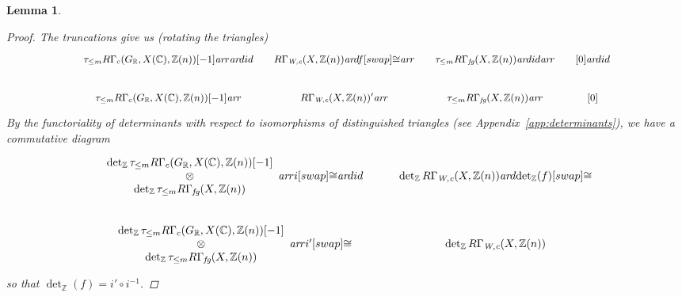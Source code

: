 \documentclass[10pt,a4paper,oneside]{article}
\newcommand{\CC}{\mathbb{C}}
\newcommand{\RR}{\mathbb{R}}
\newcommand{\ZZ}{\mathbb{Z}}
\renewcommand{\det}{\operatorname{det}}
\newcommand{\ar}{\text{\it ar}}
\newcommand{\fg}{\text{\it fg}}
\newcommand{\Wc}{\text{\it W,c}}
\theoremstyle{myplain}
\newtheorem{lemma}[theorem]{Lemma}
\theoremstyle{mydefinition}
\numberwithin{equation}{section}
\begin{document}
\begin{lemma}
\begin{proof}
    The truncations give us (rotating the triangles)
    \[ \begin{tikzcd}[column sep=1em,font=\small]
        \tau_{\le m} R\Gamma_c (G_\RR, X (\CC), \ZZ (n))[-1] \ar{r}\ar{d}{id} & R\Gamma_\Wc (X, \ZZ (n))\ar{d}{f}[swap]{\cong}\ar{r} & \tau_{\le m} R\Gamma_\fg (X,\ZZ(n)) \ar{d}{id}\ar{r} & {[0]} \ar{d}{id} \\
        \tau_{\le m} R\Gamma_c (G_\RR, X (\CC), \ZZ (n))[-1] \ar{r} & R\Gamma_\Wc (X, \ZZ (n))' \ar{r} & \tau_{\le m} R\Gamma_\fg (X,\ZZ(n)) \ar{r} & {[0]}
      \end{tikzcd} \]
    By the functoriality of determinants with respect to isomorphisms of
    distinguished triangles (see Appendix~\ref{app:determinants}), we have a
    commutative diagram
    \[ \begin{tikzcd}
        \begin{array}{c} \det_\ZZ \tau_{\le m} R\Gamma_c (G_\RR, X (\CC), \ZZ (n))[-1] \\ \otimes \\ \det_\ZZ \tau_{\le m} R\Gamma_\fg (X,\ZZ(n)) \end{array} \ar{r}{i}[swap]{\cong} \ar{d}{id} & \det_\ZZ R\Gamma_\Wc (X,\ZZ(n)) \ar{d}{\det_\ZZ (f)}[swap]{\cong} \\
        \begin{array}{c} \det_\ZZ \tau_{\le m} R\Gamma_c (G_\RR, X (\CC), \ZZ (n))[-1] \\ \otimes \\ \det_\ZZ \tau_{\le m} R\Gamma_\fg (X, \ZZ (n)) \end{array} \ar{r}{i'}[swap]{\cong} & \det_\ZZ R\Gamma_\Wc (X,\ZZ(n))
      \end{tikzcd} \]
    so that $\det_\ZZ (f) = i'\circ i^{-1}$.
  \end{proof}
\end{lemma}
\end{document}
